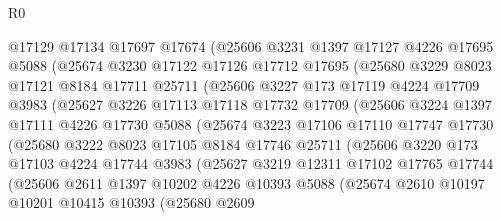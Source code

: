 \begin{lexlean}{R0}
\begin{coremodule}
            @17129
            @17134
            @17697
            @17674
            (@25606
              @3231
              @1397
              @17127
              @4226
              @17695
              @5088
              (@25674
                @3230
                @17122
                @17126
                @17712
                @17695
                (@25680
                  @3229
                  @8023
                  @17121
                  @8184
                  @17711
                  @25711
                  (@25606
                    @3227
                    @173
                    @17119
                    @4224
                    @17709
                    @3983
                    (@25627
                      @3226
                      @17113
                      @17118
                      @17732
                      @17709
                      (@25606
                        @3224
                        @1397
                        @17111
                        @4226
                        @17730
                        @5088
                        (@25674
                          @3223
                          @17106
                          @17110
                          @17747
                          @17730
                          (@25680
                            @3222
                            @8023
                            @17105
                            @8184
                            @17746
                            @25711
                            (@25606
                              @3220
                              @173
                              @17103
                              @4224
                              @17744
                              @3983
                              (@25627
                                @3219
                                @12311
                                @17102
                                @17765
                                @17744
                                (@25606
                                  @2611
                                  @1397
                                  @10202
                                  @4226
                                  @10393
                                  @5088
                                  (@25674
                                    @2610
                                    @10197
                                    @10201
                                    @10415
                                    @10393
                                    (@25680
                                      @2609

\end{coremodule}
\end{lexlean}
